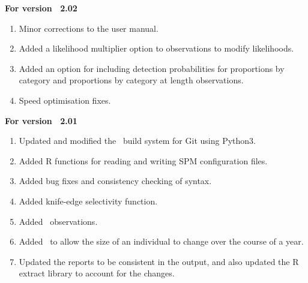 \textbf{For version \SPM\ 2.02}

\begin{enumerate}
  \item Minor corrections to the user manual.
	\item Added a likelihood multiplier option to observations to modify likelihoods.
	\item Added an option for including detection probabilities for proportions by category and proportions by category at length observations.
	\item Speed optimisation fixes.
\end{enumerate}

\textbf{For version \SPM\ 2.01}

\begin{enumerate}
  \item Updated and modified the \SPM\ build system for Git using Python3.
  \item Added R functions for reading and writing SPM configuration files.
	\item Added bug fixes and consistency checking of syntax.
	\item Added knife-edge selectivity function.
  \item Added\  observations.
  \item Added\  to allow the size of an individual to change over the course of a year.
  \item Updated the reports to be consistent in the output, and also updated the R extract library to account for the changes.
\end{enumerate}
